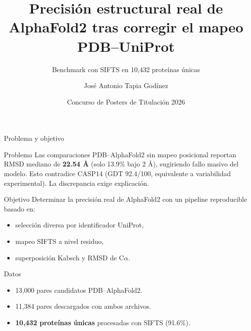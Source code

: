 \documentclass[aspectratio=169,11pt]{beamer}
\title{Precisión estructural real de AlphaFold2 tras corregir el mapeo PDB--UniProt}
\subtitle{Benchmark con SIFTS en 10,432 proteínas únicas}
\author{José Antonio Tapia Godínez}
\institute{Maestría en Ciencia de Datos, ITAM}
\date{Concurso de Posters de Titulación 2026}
\begin{document}
\begin{frame}
  \titlepage
\end{frame}

\begin{frame}[t,shrink=8]{Problema y objetivo}
  \small
  \begin{block}{Problema}
    Las comparaciones PDB--AlphaFold2 sin mapeo posicional reportan RMSD mediano de \textbf{22.54 \AA} (solo 13.9\% bajo 2 \AA), sugiriendo fallo masivo del modelo. Esto contradice CASP14 (GDT 92.4/100, equivalente a variabilidad experimental). La discrepancia exige explicación.
  \end{block}

  \begin{block}{Objetivo}
    Determinar la precisión real de AlphaFold2 con un pipeline reproducible basado en:
    \begin{itemize}
      \item selección diversa por identificador UniProt,
      \item mapeo SIFTS a nivel residuo,
      \item superposición Kabsch y RMSD de C$\alpha$.
    \end{itemize}
  \end{block}

  \begin{block}{Datos}
    \begin{itemize}
      \item 13,000 pares candidatos PDB--AlphaFold2.
      \item 11,384 pares descargados con ambos archivos.
      \item \textbf{10,432 proteínas únicas} procesadas con SIFTS (91.6\%).
    \end{itemize}
  \end{block}
\end{frame}
\end{document}
